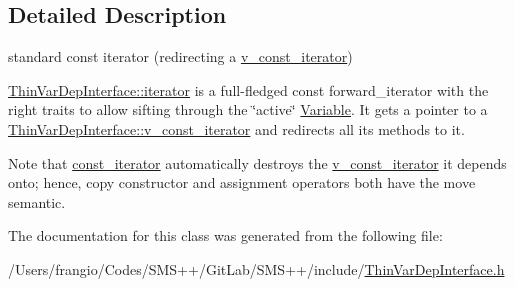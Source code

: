 \subsection{Detailed Description}
standard const iterator (redirecting a \mbox{\hyperlink{class_s_m_spp__di__unipi__it_1_1_thin_var_dep_interface_1_1v__const__iterator}{v\+\_\+const\+\_\+iterator}}) 

\mbox{\hyperlink{class_s_m_spp__di__unipi__it_1_1_thin_var_dep_interface_1_1iterator}{Thin\+Var\+Dep\+Interface\+::iterator}} is a full-\/fledged const forward\+\_\+iterator with the right traits to allow sifting through the \char`\"{}active\char`\"{} \mbox{\hyperlink{class_s_m_spp__di__unipi__it_1_1_variable}{Variable}}. It gets a pointer to a \mbox{\hyperlink{class_s_m_spp__di__unipi__it_1_1_thin_var_dep_interface_1_1v__const__iterator}{Thin\+Var\+Dep\+Interface\+::v\+\_\+const\+\_\+iterator}} and redirects all its methods to it.

Note that \mbox{\hyperlink{class_s_m_spp__di__unipi__it_1_1_thin_var_dep_interface_1_1const__iterator}{const\+\_\+iterator}} automatically destroys the \mbox{\hyperlink{class_s_m_spp__di__unipi__it_1_1_thin_var_dep_interface_1_1v__const__iterator}{v\+\_\+const\+\_\+iterator}} it depends onto; hence, copy constructor and assignment operators both have the move semantic. 

The documentation for this class was generated from the following file\+:\begin{DoxyCompactItemize}
\item 
/\+Users/frangio/\+Codes/\+S\+M\+S++/\+Git\+Lab/\+S\+M\+S++/include/\mbox{\hyperlink{_thin_var_dep_interface_8h}{Thin\+Var\+Dep\+Interface.\+h}}\end{DoxyCompactItemize}
